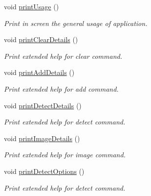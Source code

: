 \begin{DoxyCompactItemize}
void \mbox{\hyperlink{classConsoleController_a771c221ac40cd6441f13c76bd08b6927}{print\+Usage}} ()
\begin{DoxyCompactList}\small\item\em Print in screen the general usage of application. \end{DoxyCompactList}\item 
\mbox{\label{classConsoleController_a08cea6c7cb62ea9961af568daeec69c5}} 
void \mbox{\hyperlink{classConsoleController_a08cea6c7cb62ea9961af568daeec69c5}{print\+Clear\+Details}} ()
\begin{DoxyCompactList}\small\item\em Print extended help for clear command. \end{DoxyCompactList}\item 
\mbox{\label{classConsoleController_a5e2c72a9589fc8b5a2d9ba5c905850c8}} 
void \mbox{\hyperlink{classConsoleController_a5e2c72a9589fc8b5a2d9ba5c905850c8}{print\+Add\+Details}} ()
\begin{DoxyCompactList}\small\item\em Print extended help for add command. \end{DoxyCompactList}\item 
\mbox{\label{classConsoleController_aeef4c9eb3a199d0674c0841eadad6d7e}} 
void \mbox{\hyperlink{classConsoleController_aeef4c9eb3a199d0674c0841eadad6d7e}{print\+Detect\+Details}} ()
\begin{DoxyCompactList}\small\item\em Print extended help for detect command. \end{DoxyCompactList}\item 
\mbox{\label{classConsoleController_ae99f394b6610fd7c771e31d864526756}} 
void \mbox{\hyperlink{classConsoleController_ae99f394b6610fd7c771e31d864526756}{print\+Image\+Details}} ()
\begin{DoxyCompactList}\small\item\em Print extended help for image command. \end{DoxyCompactList}\item 
\mbox{\label{classConsoleController_a5dd7913a42068df42c3de6dc1f313537}} 
void \mbox{\hyperlink{classConsoleController_a5dd7913a42068df42c3de6dc1f313537}{print\+Detect\+Options}} ()
\begin{DoxyCompactList}\small\item\em Print extended help for detect command. \end{DoxyCompactList}\end{DoxyCompactItemize}
